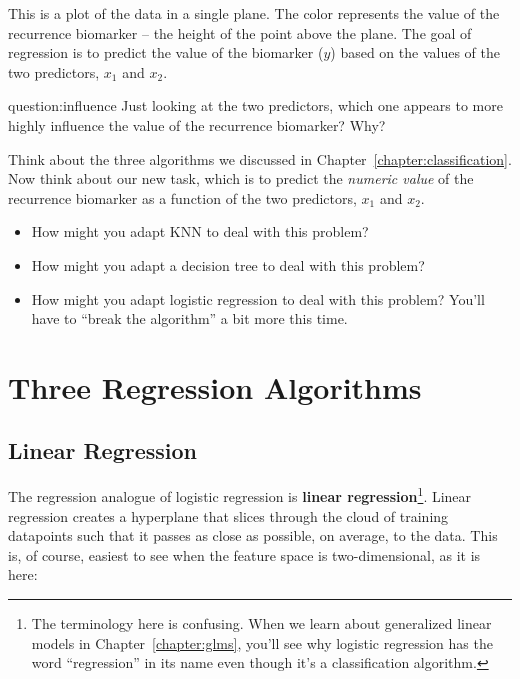 This is a plot of the data in a single plane. The color represents the value of the recurrence biomarker -- the height of the point above the plane. The goal of regression is to predict the value of the biomarker ($y$) based on the values of the two predictors, $x_1$ and $x_2$.
\vspace{5mm} 

\begin{question}{question:influence}
Just looking at the two predictors, which one appears to more highly influence the value of the recurrence biomarker? Why?
\end{question}

\begin{question}{}
Think about the three algorithms we discussed in Chapter~\ref{chapter:classification}. Now think about our new task, which is to predict the \emph{numeric value} of the recurrence biomarker as a function of the two predictors, $x_1$ and $x_2$. 
\begin{itemize}
\item How might you adapt KNN to deal with this problem?
\item How might you adapt a decision tree to deal with this problem?
\item How might you adapt logistic regression to deal with this problem? You'll have to ``break the algorithm'' a bit more this time.  
\end{itemize}
\end{question}


\section{Three Regression Algorithms}

\subsection{Linear Regression}

The regression analogue of logistic regression is \textbf{linear regression}\footnote{The terminology here is confusing. When we learn about generalized linear models in Chapter~\ref{chapter:glms}, you'll see why logistic regression has the word ``regression'' in its name even though it's a classification algorithm.}. Linear regression creates a hyperplane that slices through the cloud of training datapoints such that it passes as close as possible, on average, to the data. This is, of course, easiest to see when the feature space is two-dimensional, as it is here:

